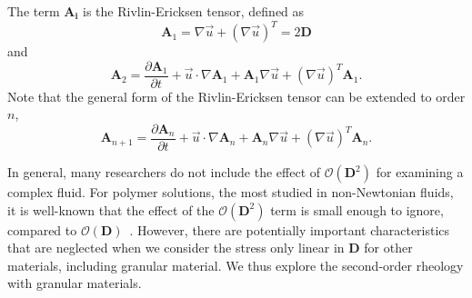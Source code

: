 The term $\bm{A_i}$ is the Rivlin-Ericksen tensor, defined as
\begin{equation}
   {\bm A_1}  = \nabla \vec{u} +  \left( \nabla \vec{u} \right)^T = 2 \bm{D} 
   \label{eq_A1}
\end{equation}
and 
\begin{equation}
   \boldsymbol{A}_2
   =\frac{\partial \boldsymbol{A}_1}{\partial t} + \vec{u} \cdot \nabla \boldsymbol{A}_1+\boldsymbol{A}_1 \nabla \vec{u}+ \left(\nabla \vec{u} \right)^T \boldsymbol{A}_1.
   \label{eq_A2}
\end{equation}
Note that the general form of the Rivlin-Ericksen tensor can be extended to order $n$,  
\begin{equation}
  \boldsymbol{A}_{n+1}
  =\frac{\partial \boldsymbol{A}_{n}}{\partial t} + \vec{u} \cdot \nabla \boldsymbol{A}_n+\boldsymbol{A}_n \nabla \vec{u}+ \left(\nabla \vec{u} \right)^T \boldsymbol{A}_n.
\end{equation}
\par
In general, many researchers do not include the effect of $\mathcal{O}\left( \bm{D}^2 \right)$ for examining a complex fluid. For polymer solutions, the most studied in non-Newtonian fluids, it is well-known that the effect of the $\mathcal{O}\left( \bm{D}^2 \right)$ term is small enough to ignore, compared to  $\mathcal{O}\left( \bm{D} \right)$~\cite{bird_dynamics_1987}. 
However, there are potentially important characteristics that are neglected when we consider the stress only linear in $\boldsymbol{D}$ for other materials, including granular material. 
We thus explore the second-order rheology with granular materials.





